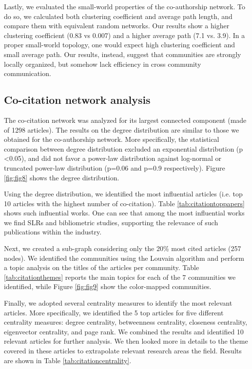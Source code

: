 \documentclass[jmse,review,submit,pdftex,moreauthors]{Definitions/mdpi}
\begin{document}
Lastly, we evaluated the small-world properties of the co-authorship network. To do so, we calculated both clustering coefficient and average path length, and compare them with equivalent random networks. Our results show a higher clustering coefficient (0.83 vs 0.007) and a higher average path (7.1 vs. 3.9). In a proper small-world topology, one would expect high clustering coefficient and small average path. Our results, instead, suggest that communities are strongly locally organized, but somehow lack efficiency in cross community communication.

\subsection{Co-citation network analysis}
The co-citation network was analyzed for its largest connected component (made of 1298 articles). The results on the degree distribution are similar to those we obtained for the co-authorship network. More specifically, the statistical comparison between degree distribution excluded an exponential distribution (p \textless 0.05), and did not favor a power-law distribution against log-normal or truncated power-law distribution (p=0.06 and p=0.9 respectively). Figure \ref{fig:fig8} shows the degree distribution.

Using the degree distribution, we identified the most influential articles (i.e. top 10 articles with the highest number of co-citation). Table \ref{tab:citationtoppapers} shows such influential works. One can see that among the most influential works we find SLRs and bibliometric studies, supporting the relevance of such publications within the industry.

Next, we created a sub-graph considering only the 20\% most cited articles (257 nodes). We identified the communities using the Louvain algorithm and perform a topic analysis on the titles of the articles per community. Table \ref{tab:citationthemes} reports the main topics for each of the 7 communities we identified, while Figure \ref{fig:fig9} show the color-mapped communities.

Finally, we adopted several centrality measures to identify the most relevant articles. More specifically, we identified the 5 top articles for five different centrality measures: degree centrality, betweenness centrality, closeness centrality, eigenvector centrality, and page rank. We combined the results and identified 10 relevant articles for further analysis. We then looked more in details to the theme covered in these articles to extrapolate relevant research areas the field. Results are shown in Table \ref{tab:citationcentrality}.
\end{document}
